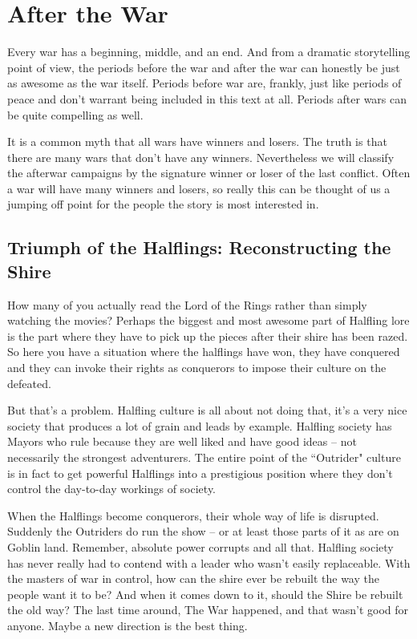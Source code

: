 \section{After the War}
\vspace*{-10pt}

Every war has a beginning, middle, and an end. And from a dramatic storytelling point of view, the periods before the war and after the war can honestly be just as awesome as the war itself. Periods before war are, frankly, just like periods of peace and don't warrant being included in this text at all. Periods after wars can be quite compelling as well.

It is a common myth that all wars have winners and losers. The truth is that there are many wars that don't have any winners. Nevertheless we will classify the afterwar campaigns by the signature winner or loser of the last conflict. Often a war will have many winners and losers, so really this can be thought of us a jumping off point for the people the story is most interested in.

\subsection{Triumph of the Halflings: Reconstructing the Shire}

How many of you actually read the Lord of the Rings rather than simply watching the movies? Perhaps the biggest and most awesome part of Halfling lore is the part where they have to pick up the pieces after their shire has been razed. So here you have a situation where the halflings have won, they have conquered and they can invoke their rights as conquerors to impose their culture on the defeated.

But that's a problem. Halfling culture is all about not doing that, it's a very nice society that produces a lot of grain and leads by example. Halfling society has Mayors who rule because they are well liked and have good ideas -- not necessarily the strongest adventurers. The entire point of the ``Outrider" culture is in fact to get powerful Halflings into a prestigious position where they don't control the day-to-day workings of society.

When the Halflings become conquerors, their whole way of life is disrupted. Suddenly the Outriders do run the show -- or at least those parts of it as are on Goblin land. Remember, absolute power corrupts and all that. Halfling society has never really had to contend with a leader who wasn't easily replaceable. With the masters of war in control, how can the shire ever be rebuilt the way the people want it to be? And when it comes down to it, should the Shire be rebuilt the old way? The last time around, The War happened, and that wasn't good for anyone. Maybe a new direction is the best thing.

